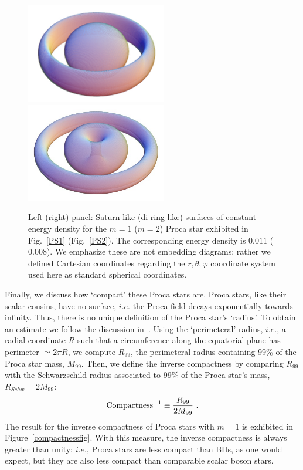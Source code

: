\begin{figure}[h!]
  \begin{center}
    \includegraphics[width=6.1cm]{papers/Proca/3DPS1-m=1-v2.pdf} \qquad \qquad 
       \includegraphics[width=6.1cm]{papers/Proca/3DPS1-m=2-v2.pdf}   
         \end{center}
 \caption{Left (right) panel: Saturn-like (di-ring-like) surfaces of constant energy density for the $m=1$ ($m=2$) Proca star exhibited in Fig.~\ref{PS1} (Fig.~\ref{PS2}). The corresponding energy density is $0.011$ ($0.008$). We emphasize these are not embedding diagrams; rather we defined Cartesian coordinates regarding the $r,\theta,\varphi$ coordinate system used here as standard spherical coordinates.}
  \label{3D}
\end{figure}

Finally, we discuss how `compact' these Proca stars are. Proca stars, like their scalar cousins, have no surface, $i.e.$ the Proca field decays exponentially towards infinity. Thus, there is no unique definition of the Proca star's `radius'. To obtain an estimate we follow the discussion in~\cite{AmaroSeoane:2010qx,Herdeiro:2015gia}. Using the `perimeteral' radius, $i.e.$, a radial coordinate $R$ such that a circumference along the equatorial plane has perimeter $\simeq 2\pi R$,  we compute $R_{99}$, the perimeteral radius containing 99\% of the Proca star mass, $M_{99}$. Then, we define the inverse compactness by comparing $R_{99}$ with the Schwarzschild radius associated to 99\% of the Proca star's mass, $R_{Schw}=2M_{99}$:
%
\begin{equation}
{\rm Compactness}^{-1}\equiv  \frac{R_{99}}{2M_{99}} \ .
\label{compactness}
\end{equation}
%
The result for the inverse compactness of Proca stars with $m=1$ is exhibited in Figure~\ref{compactnessfig}. With this measure, the inverse compactness is always greater than unity; $i.e.$, Proca stars are less compact than BHs, as one would expect, but they are also less compact than comparable scalar boson stars.


